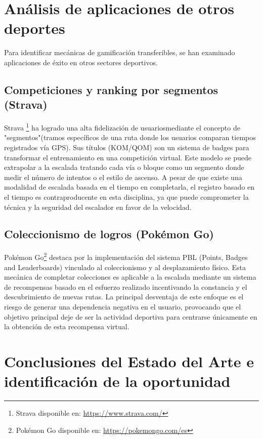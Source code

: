 \section{Análisis de aplicaciones de otros deportes}

Para identificar mecánicas de gamificación transferibles, se han examinado aplicaciones de éxito en otros sectores deportivos.

\subsection{Competiciones y ranking por segmentos (Strava)}
Strava \footnote{Strava disponible en: \url{https://www.strava.com/}} ha logrado una alta fidelización de usuariosmediante el concepto de "segmentos"(tramos específicos de una ruta donde los usuarios comparan tiempos registrados vía GPS). Sus títulos (KOM/QOM) son un sistema de badges para transformar el entrenamiento en una competición virtual. Este modelo se puede extrapolar a la escalada tratando cada vía o bloque como un segmento donde medir el número de intentos o el estilo de ascenso. A pesar de que existe una modalidad de escalada basada en el tiempo en completarla, el registro basado en el tiempo es contraproducente en esta disciplina, ya que puede comprometer la técnica y la seguridad del escalador en favor de la velocidad.

\subsection{Coleccionismo de logros (Pokémon Go)}
Pokémon Go\footnote{Pokémon Go disponible en: \url{https://pokemongo.com/es}} destaca por la implementación del sistema PBL (Points, Badges and Leaderboards) vinculado al coleccionismo y al desplazamiento físico. Esta mecánica de completar colecciones es aplicable a la escalada mediante un sistema de recompensas basado en el esfuerzo realizado incentivando la constancia y el descubrimiento de nuevas rutas. La principal desventaja de este enfoque es el riesgo de generar una dependencia negativa en el usuario, provocando que el objetivo principal deje de ser la actividad deportiva para centrarse únicamente en la obtención de esta recompensa virtual.

\section{Conclusiones del Estado del Arte e identificación de la oportunidad}
 
